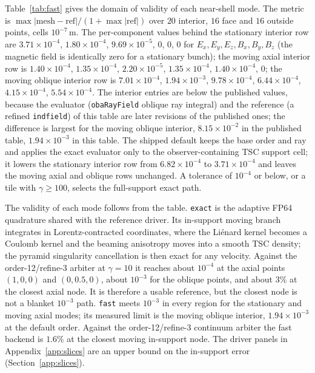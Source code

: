 Table~\ref{tab:fast} gives the domain of validity of each near-shell mode.
The metric is
$\max|\mathrm{mesh}-\mathrm{ref}|/(1+\max|\mathrm{ref}|)$ over $20$
interior, $16$ face and $16$ outside points, cells $10^{-7}$\,m. The
per-component values behind the stationary interior row are
$3.71\times10^{-4}$, $1.80\times10^{-4}$, $9.69\times10^{-5}$, $0$, $0$,
$0$ for $E_x,E_y,E_z,B_x,B_y,B_z$ (the magnetic field is identically zero
for a stationary bunch); the moving axial interior row is
$1.40\times10^{-4}$, $1.35\times10^{-4}$, $2.20\times10^{-5}$,
$1.35\times10^{-4}$, $1.40\times10^{-4}$, $0$; the moving oblique interior
row is $7.01\times10^{-4}$, $1.94\times10^{-3}$, $9.78\times10^{-4}$,
$6.44\times10^{-4}$, $4.15\times10^{-4}$, $5.54\times10^{-4}$. The interior
entries are below the published values, because the evaluator
(\texttt{obaRayField} oblique ray integral) and the reference (a refined
\texttt{indfield}) of this table are later revisions of the published
ones; the difference is largest for the moving oblique interior,
$8.15\times10^{-2}$ in the published table,
$1.94\times10^{-3}$ in this table. The shipped default keeps the base
order and ray and applies the exact evaluator only to the observer-containing
TSC support cell; it lowers the stationary interior row from
$6.82\times10^{-4}$ to $3.71\times10^{-4}$ and leaves the moving axial and
oblique rows unchanged. A tolerance of $10^{-4}$ or below, or a tile with
$\gamma\ge100$, selects the full-support exact path.

The validity of each mode follows from the table. \texttt{exact} is the
adaptive FP64 quadrature shared with the reference driver. Its in-support
moving branch integrates in Lorentz-contracted coordinates, where the
Li\'enard kernel becomes a Coulomb kernel and the beaming anisotropy moves
into a smooth TSC density; the pyramid singularity cancellation is then
exact for any velocity. Against the order-12/refine-3 arbiter at
$\gamma=10$ it reaches about $10^{-4}$ at the axial points $(1,0,0)$ and
$(0,0.5,0)$, about $10^{-3}$ for the oblique points, and about $3\%$ at the
closest axial node. It is therefore a usable reference, but the closest
node is not a blanket $10^{-3}$ path. \texttt{fast} meets $10^{-3}$ in
every region for the stationary and moving axial modes; its measured limit
is the moving oblique interior, $1.94\times10^{-3}$ at the default order.
Against the order-12/refine-3 continuum arbiter the fast backend is $1.6\%$
at the closest moving in-support node. The driver panels in
Appendix~\ref{app:slices} are an upper bound on the in-support error
(Section~\ref{app:slices}).


